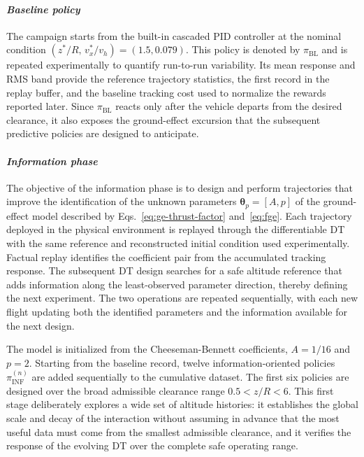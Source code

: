 \documentclass[journal]{IEEEtran}
\begin{document}
\paragraph*{\textit{Baseline policy}}
The campaign starts from the built-in cascaded PID controller at the nominal condition $(z^\ast/R,\,v_x^\ast/v_h)=(1.5,0.079)$. This policy is denoted by $\pi_{\mathrm{BL}}$ and is repeated experimentally to quantify run-to-run variability. Its mean response and RMS band provide the reference trajectory statistics, the first record in the replay buffer, and the baseline tracking cost used to normalize the rewards reported later. Since $\pi_{\mathrm{BL}}$ reacts only after the vehicle departs from the desired clearance, it also exposes the ground-effect excursion that the subsequent predictive policies are designed to anticipate.

\paragraph*{\textit{Information phase}}
\label{sec:information-phase}
The objective of the information phase is to design and perform trajectories that improve the identification of the unknown parameters $\boldsymbol{\theta}_p=[A,p]$ of the ground-effect model described by Eqs.~\eqref{eq:ge-thrust-factor} and~\eqref{eq:fge}.
Each trajectory deployed in the physical environment is replayed through the differentiable DT with the same reference and reconstructed initial condition used experimentally. Factual replay identifies the coefficient pair from the accumulated tracking response. The subsequent DT design searches for a safe altitude reference that adds information along the least-observed parameter direction, thereby defining the next experiment. The two operations are repeated sequentially, with each new flight updating both the identified parameters and the information available for the next design.

The model is initialized from the Cheeseman-Bennett coefficients, $A=1/16$ and $p=2$. Starting from the baseline record, twelve information-oriented policies $\pi_{\mathrm{INF}}^{(n)}$ are added sequentially to the cumulative dataset. The first six policies are designed over the broad admissible clearance range $0.5<z/R<6$. This first stage deliberately explores a wide set of altitude histories: it establishes the global scale and decay of the interaction without assuming in advance that the most useful data must come from the smallest admissible clearance, and it verifies the response of the evolving DT over the complete safe operating range.
\end{document}
